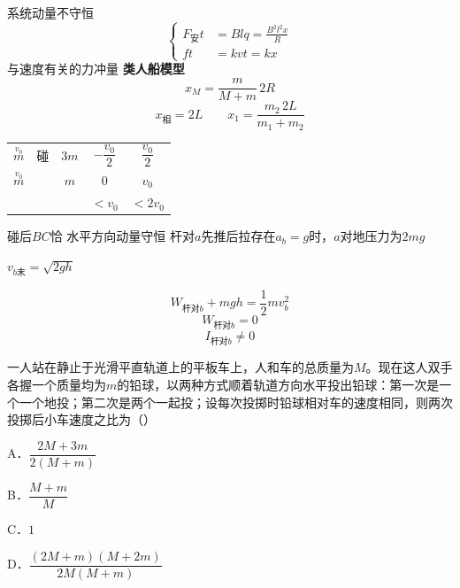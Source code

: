 系统动量不守恒
\[
\left\{
\begin{aligned}
F_{\text{安}}t&=Blq=\frac{B^2l^2x}{R}\\
ft&=kvt=kx
\end{aligned}
\right.
\]
与速度有关的力冲量
\textbf{类人船模型}
\[
x_M=\frac{m}{M+m}\,2R
\]
\[
x_{\text{相}}=2L\qquad x_1=\frac{m_2\,2L}{m_1+m_2}
\]
\begin{center}
\begin{tabular}{ccccc}
$\overset{v_0}{m}$ & 碰 & $3m$ & $-\dfrac{v_0}{2}$ & $\dfrac{v_0}{2}$\\[6pt]
$\overset{v_0}{m}$ & & $m$ & $0$ & $v_0$\\[6pt]
 & & & $<v_0$ & $<2v_0$
\end{tabular}
\end{center}
碰后$BC$恰
水平方向动量守恒
杆对$a$先推后拉\quad 存在$a_b=g$时，$a$对地压力为$2mg$

$v_{b\text{末}}=\sqrt{2gh}$

\[
W_{\text{杆对}b}+mgh=\frac{1}{2}mv_b^2
\]
\[
W_{\text{杆对}b}=0
\]
\[
I_{\text{杆对}b}\neq 0
\]
\begin{problem}[5]
一人站在静止于光滑平直轨道上的平板车上，人和车的总质量为$M$。现在这人双手各握一个质量均为$m$的铅球，以两种方式顺着轨道方向水平投出铅球：第一次是一个一个地投；第二次是两个一起投；设每次投掷时铅球相对车的速度相同，则两次投掷后小车速度之比为（）

A．$\dfrac{2M+3m}{2(M+m)}$

B．$\dfrac{M+m}{M}$

C．$1$%

D．$\dfrac{(2M+m)(M+2m)}{2M(M+m)}$
\end{problem}

